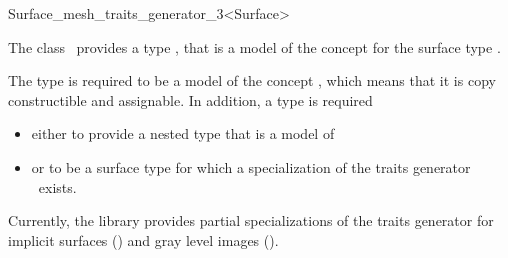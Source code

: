 

\begin{ccRefClass}{Surface_mesh_traits_generator_3<Surface>}


\ccDefinition
  
The class \ccRefName\ provides 
 a type , that is 
a model of the concept 
for the surface type .

The type  is required to be a model of the concept
,
which means that it is copy constructible
and assignable.
 In addition, a  type is required
\begin{itemize}
\item 
either to provide a nested type
that is a model of 
\item or to be a surface type for which a specialization
of the traits generator \ccRefName\ exists.
\end{itemize}
 

Currently, the library provides partial specializations
of  the   traits generator 
for implicit surfaces () and 
gray level images ().
 






\ccSeeAlso

  





\end{ccRefClass}


